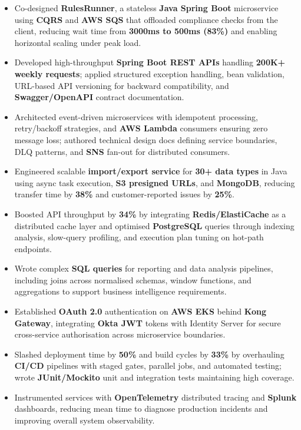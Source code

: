 \documentclass[letterpaper,10pt]{article}
\begin{document}
\begin{itemize}[leftmargin=*]
    \item Co-designed \textbf{RulesRunner}, a stateless \textbf{Java Spring Boot} microservice using \textbf{CQRS} and \textbf{AWS SQS} that offloaded compliance checks from the client, reducing wait time from \textbf{3000ms to 500ms (83\%)} and enabling horizontal scaling under peak load.
    \item Developed high-throughput \textbf{Spring Boot REST APIs} handling \textbf{200K+ weekly requests}; applied structured exception handling, bean validation, URL-based API versioning for backward compatibility, and \textbf{Swagger/OpenAPI} contract documentation.
    \item Architected event-driven microservices with idempotent processing, retry/backoff strategies, and \textbf{AWS Lambda} consumers ensuring zero message loss; authored technical design docs defining service boundaries, DLQ patterns, and \textbf{SNS} fan-out for distributed consumers.
    \item Engineered scalable \textbf{import/export service} for \textbf{30+ data types} in Java using async task execution, \textbf{S3 presigned URLs}, and \textbf{MongoDB}, reducing transfer time by \textbf{38\%} and customer-reported issues by \textbf{25\%}.
    \item Boosted API throughput by \textbf{34\%} by integrating \textbf{Redis/ElastiCache} as a distributed cache layer and optimised \textbf{PostgreSQL} queries through indexing analysis, slow-query profiling, and execution plan tuning on hot-path endpoints.
    \item Wrote complex \textbf{SQL queries} for reporting and data analysis pipelines, including joins across normalised schemas, window functions, and aggregations to support business intelligence requirements.
    \item Established \textbf{OAuth 2.0} authentication on \textbf{AWS EKS} behind \textbf{Kong Gateway}, integrating \textbf{Okta JWT} tokens with Identity Server for secure cross-service authorisation across microservice boundaries.
    \item Slashed deployment time by \textbf{50\%} and build cycles by \textbf{33\%} by overhauling \textbf{CI/CD} pipelines with staged gates, parallel jobs, and automated testing; wrote \textbf{JUnit/Mockito} unit and integration tests maintaining high coverage.
    \item Instrumented services with \textbf{OpenTelemetry} distributed tracing and \textbf{Splunk} dashboards, reducing mean time to diagnose production incidents and improving overall system observability.
\end{itemize}
\end{document}
